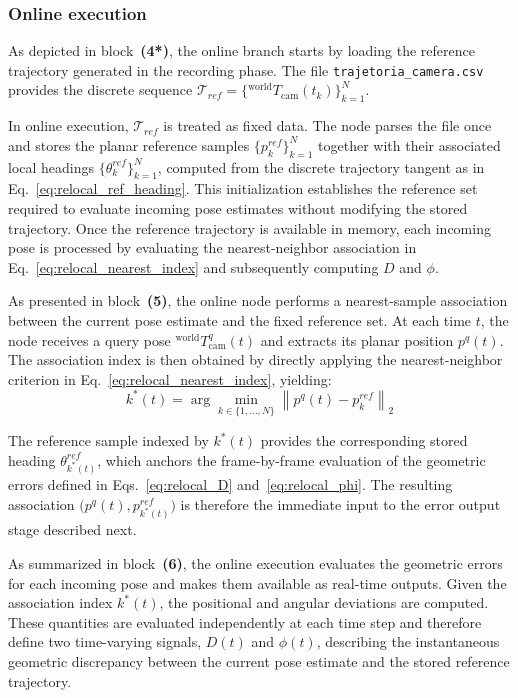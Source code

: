 \documentclass[a4paper,11pt]{article}
\begin{document}
\subsubsection{Online execution}
\label{subsubsec:relocal_online}

As depicted in block~\textbf{(4*)}, the online branch starts by loading the reference trajectory generated in the recording phase. The file \texttt{trajetoria\_camera.csv} provides the discrete sequence $\mathcal{T}_{ref}=\{{}^{\text{world}}\!T_{\text{cam}}(t_k)\}_{k=1}^{N}$.

In online execution, $\mathcal{T}_{ref}$ is treated as fixed data. The node parses the file once and stores the planar reference samples $\{p_k^{ref}\}_{k=1}^{N}$ together with their associated local headings $\{\theta_k^{ref}\}_{k=1}^{N}$, computed from the discrete trajectory tangent as in Eq.~\eqref{eq:relocal_ref_heading}. This initialization establishes the reference set required to evaluate incoming pose estimates without modifying the stored trajectory. Once the reference trajectory is available in memory, each incoming pose is processed by evaluating the nearest-neighbor association in Eq.~\eqref{eq:relocal_nearest_index} and subsequently computing $D$ and $\phi$.

As presented in block~\textbf{(5)}, the online node performs a nearest-sample association between the current pose estimate and the fixed reference set. At each time $t$, the node receives a query pose ${}^{\text{world}}\!T_{\text{cam}}^{q}(t)$ and extracts its planar position $p^{q}(t)$. The association index is then obtained by directly applying the nearest-neighbor criterion in Eq.~\eqref{eq:relocal_nearest_index}, yielding:
\begin{equation}
	k^{*}(t)
	=
	\arg\min_{k \in \{1,\dots,N\}}
	\left\|
	p^{q}(t) - p_k^{ref}
	\right\|_2
	\label{eq:relocal_nearest_index_online}
\end{equation}

The reference sample indexed by $k^{*}(t)$ provides the corresponding stored heading $\theta^{ref}_{k^{*}(t)}$, which anchors the frame-by-frame evaluation of the geometric errors defined in Eqs.~\eqref{eq:relocal_D} and~\eqref{eq:relocal_phi}. The resulting association $\big(p^{q}(t), p^{ref}_{k^{*}(t)}\big)$ is therefore the immediate input to the error output stage described next.

As summarized in block~\textbf{(6)}, the online execution evaluates the geometric errors for each incoming pose and makes them available as real-time outputs. Given the association index $k^{*}(t)$, the positional and angular deviations are computed. These quantities are evaluated independently at each time step and therefore define two time-varying signals, $D(t)$ and $\phi(t)$, describing the instantaneous geometric discrepancy between the current pose estimate and the stored reference trajectory.
\end{document}
